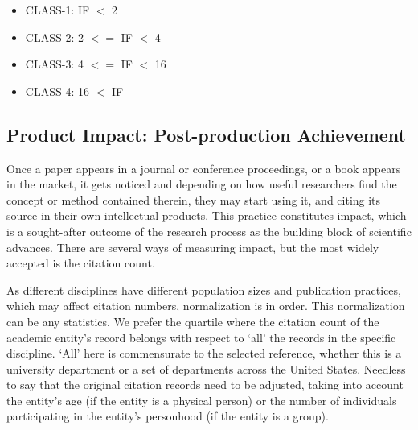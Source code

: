 \begin{itemize}
\item CLASS-1: IF $<$ 2
\item CLASS-2: 2 $<=$ IF $<$ 4
\item CLASS-3: 4 $<=$ IF $<$ 16
\item CLASS-4: 16 $<$ IF
\end{itemize}




\subsection {Product Impact: Post-production Achievement}
Once a paper appears in a journal or conference proceedings, or a book appears in the market, it gets noticed and depending on how useful researchers find the concept or method contained therein, they may start using it, and citing its source in their own intellectual products. This practice constitutes impact, which is a sought-after outcome of the research process as the building block of scientific advances. There are several ways of measuring impact, but the most widely accepted is the citation count.

As different disciplines have different population sizes and publication practices, which may affect citation numbers, normalization is in order. This normalization can be any statistics. We prefer the quartile where the citation count of the academic entity's record belongs with respect to `all' the records in the specific discipline.  `All' here is commensurate to the selected reference, whether this is a university department or a set of departments across the United States. Needless to say that the original citation records need to be adjusted, taking into account the entity's age (if the entity is a physical person) or the number of individuals participating in the entity's personhood (if the entity is a group).


